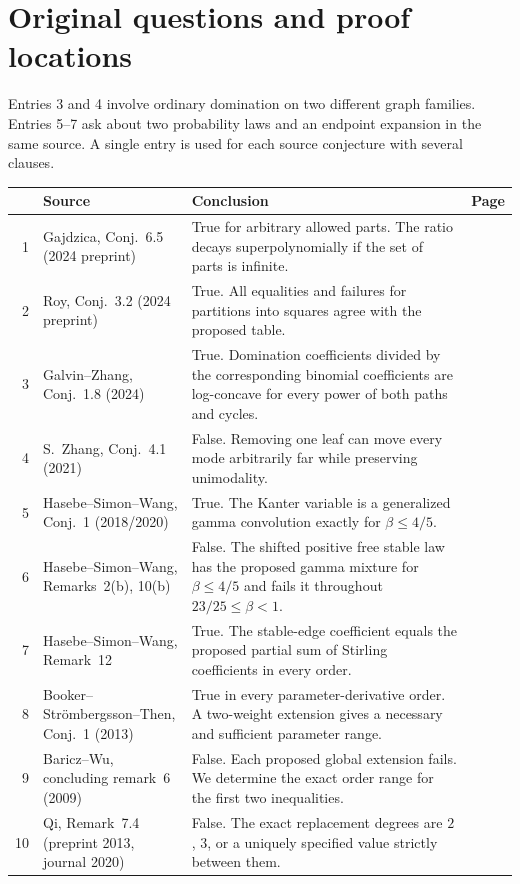 \documentclass[11pt,a4paper]{article}
\numberwithin{equation}{section}
\begin{document}
\section{Original questions and proof locations}\label{sec:map}
Entries 3 and 4 involve ordinary domination on two different graph
families. Entries 5--7 ask about two probability laws and an endpoint
expansion in the same source.
A single entry is used for each source conjecture with several clauses.
\begin{center}\small
\begin{tabular}{@{}r>{\raggedright\arraybackslash}p{}>{\raggedright\arraybackslash}p{}r@{}}
\toprule
& Source & Conclusion & Page\\
\midrule
1 & Gajdzica, Conj.~6.5 (2024 preprint) & True for arbitrary allowed parts. The ratio decays superpolynomially if the set of parts is infinite. & \pageref{sec:arbitrary-A}\\[4pt]
2 & Roy, Conj.~3.2 (2024 preprint) & True. All equalities and failures for partitions into squares agree with the proposed table. & \pageref{sec:roy-squares}\\[4pt]
3 & Galvin--Zhang, Conj.~1.8 (2024) & True. Domination coefficients divided by the corresponding binomial coefficients are log-concave for every power of both paths and cycles. & \pageref{sec:gz-ulc}\\[4pt]
4 & S.~Zhang, Conj.~4.1 (2021) & False. Removing one leaf can move every mode arbitrarily far while preserving unimodality. & \pageref{sec:tree-leaf-mode}\\[4pt]
5 & Hasebe--Simon--Wang, Conj.~1 (2018/2020) & True. The Kanter variable is a generalized gamma convolution exactly for $\beta\le4/5$. & \pageref{sec:kanter}\\[4pt]
6 & Hasebe--Simon--Wang, Remarks~2(b), 10(b) & False. The shifted positive free stable law has the proposed gamma mixture for $\beta\le4/5$ and fails it throughout $23/25\le\beta<1$. & \pageref{sec:shifted-stable}\\[4pt]
7 & Hasebe--Simon--Wang, Remark~12 & True. The stable-edge coefficient equals the proposed partial sum of Stirling coefficients in every order. & \pageref{sec:stirling-edge}\\[4pt]
8 & Booker--Str\"ombergsson--Then, Conj.~1 (2013) & True in every parameter-derivative order. A two-weight extension gives a necessary and sufficient parameter range. & \pageref{sec:jacobi}\\[4pt]
9 & Baricz--Wu, concluding remark~6 (2009) & False. Each proposed global extension fails. We determine the exact order range for the first two inequalities. & \pageref{sec:red}\\[4pt]
10 & Qi, Remark~7.4 (preprint 2013, journal 2020) & False. The exact replacement degrees are $2$, $3$, or a uniquely specified value strictly between them. & \pageref{sec:degrees}\\
\bottomrule
\end{tabular}\end{center}
\end{document}
